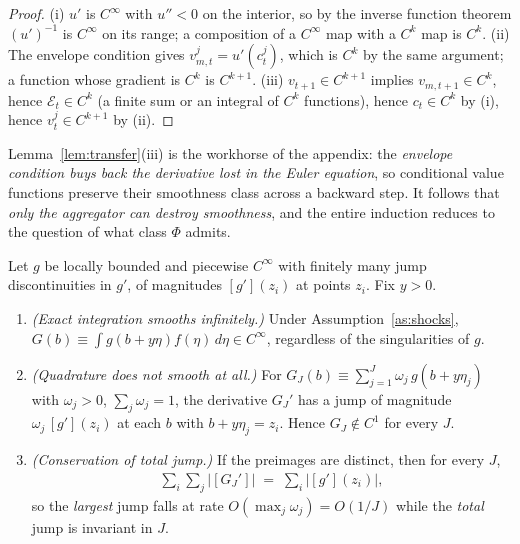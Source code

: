 \begin{proof}
(i) $u'$ is $C^{\infty}$ with $u''<0$ on the interior, so by the inverse function
theorem $(u')^{-1}$ is $C^{\infty}$ on its range; a composition of a $C^{\infty}$ map
with a $C^{k}$ map is $C^{k}$. (ii) The envelope condition gives
$v_{m,t}^{j}=u'(c_t^{j})$, which is $C^{k}$ by the same argument; a function whose
gradient is $C^{k}$ is $C^{k+1}$. (iii) $v_{t+1}\in C^{k+1}$ implies
$v_{m,t+1}\in C^{k}$, hence $\mathcal{E}_t\in C^{k}$ (a finite sum or an integral of
$C^{k}$ functions), hence $c_t\in C^{k}$ by (i), hence $v_t^{j}\in C^{k+1}$ by (ii).
\end{proof}

Lemma~\ref{lem:transfer}(iii) is the workhorse of the appendix: the \emph{envelope
condition buys back the derivative lost in the Euler equation}, so conditional value
functions preserve their smoothness class across a backward step. It follows that
\emph{only the aggregator can destroy smoothness}, and the entire induction reduces to
the question of what class $\Phi$ admits.

\begin{lemma}
\label{lem:mollify}
Let $g$ be locally bounded and piecewise $C^{\infty}$ with finitely many jump
discontinuities in $g'$, of magnitudes $[g'](z_i)$ at points $z_i$. Fix $y>0$.
\begin{enumerate}
    \item \emph{(Exact integration smooths infinitely.)} Under Assumption~\ref{as:shocks},
    $G(b)\equiv\int g(b+y\eta)f(\eta)\,d\eta\in C^{\infty}$, regardless of the
    singularities of $g$.
    \item \emph{(Quadrature does not smooth at all.)} For
    $G_J(b)\equiv\sum_{j=1}^{J}\omega_j\,g(b+y\eta_j)$ with $\omega_j>0$,
    $\sum_j\omega_j=1$, the derivative $G_J'$ has a jump of magnitude
    $\omega_j\,[g'](z_i)$ at each $b$ with $b+y\eta_j=z_i$. Hence $G_J\notin C^{1}$
    for every $J$.
    \item \emph{(Conservation of total jump.)} If the preimages are distinct, then for
    every $J$,
    \begin{align}
    \sum_{i}\sum_{j}\big|[G_J']\big| \;=\; \sum_{i}\big|[g'](z_i)\big| ,
    \end{align}
    so the \emph{largest} jump falls at rate $O(\max_j\omega_j)=O(1/J)$ while the
    \emph{total} jump is invariant in $J$.
\end{enumerate}
\end{lemma}

